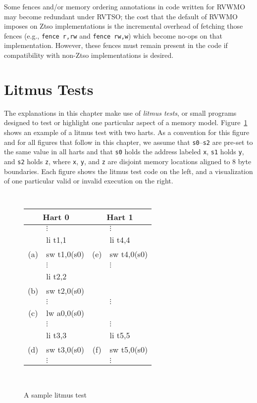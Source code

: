 Some fences and/or memory ordering annotations in code written for RVWMO may become redundant under RVTSO; the cost that the default of RVWMO imposes on Ztso implementations is the incremental overhead of fetching those fences (e.g., {\tt fence~r,rw} and {\tt fence rw,w}) which become no-ops on that implementation.
However, these fences must remain present in the code if compatibility with non-Ztso implementations is desired.

\section{Litmus Tests}
The explanations in this chapter make use of {\em litmus tests}, or small programs designed to test or highlight one particular aspect of a memory model.
Figure~\ref{fig:litmus:sample} shows an example of a litmus test with two harts.
As a convention for this figure and for all figures that follow in this chapter, we assume that {\tt s0}--{\tt s2} are pre-set to the same value in all harts and that {\tt s0} holds the address labeled {\tt x}, {\tt s1} holds {\tt y}, and {\tt s2} holds {\tt z}, where {\tt x}, {\tt y}, and {\tt z} are disjoint memory locations aligned to 8 byte boundaries.
Each figure shows the litmus test code on the left, and a visualization of one particular valid or invalid execution on the right.

\begin{figure}[h!]
  \centering
  {
    \tt\small
    \begin{tabular}{cl||cl}
    \multicolumn{2}{c}{Hart 0} & \multicolumn{2}{c}{Hart 1} \\
    \hline
          & $\vdots$    &     & $\vdots$    \\
          & li t1,1     &     & li t4,4     \\
      (a) & sw t1,0(s0) & (e) & sw t4,0(s0) \\
          & $\vdots$    &     & $\vdots$    \\
          & li t2,2     &     &             \\
      (b) & sw t2,0(s0) &     &             \\
          & $\vdots$    &     & $\vdots$    \\
      (c) & lw a0,0(s0) &     &             \\
          & $\vdots$    &     & $\vdots$    \\
          & li t3,3     &     & li t5,5     \\
      (d) & sw t3,0(s0) & (f) & sw t5,0(s0) \\
          & $\vdots$    &     & $\vdots$    \\
    \end{tabular}
  }
  ~~~~
  \diagram
  \caption{A sample litmus test}
  \label{fig:litmus:sample}
\end{figure}


